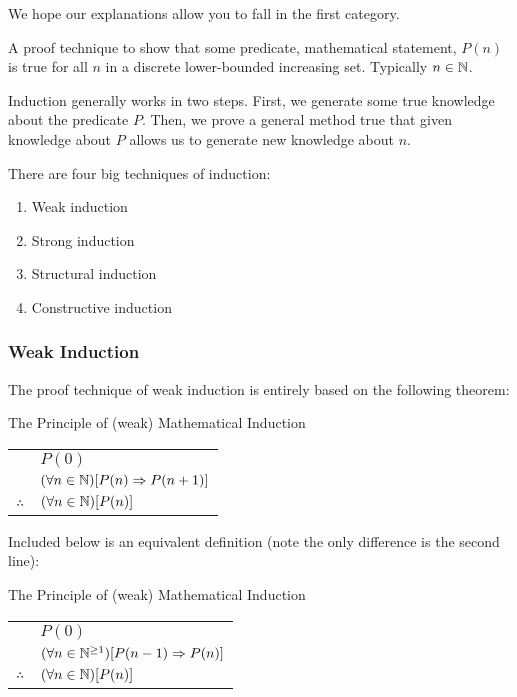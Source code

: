 \documentclass[main.tex]{subfiles}
\begin{document}
We hope our explanations allow you to fall in the first category.

\begin{defn}
	A proof technique to show that some predicate, mathematical statement, \(P(n)\) is true for all \(n\) in a discrete lower-bounded increasing set. Typically \(n \in \mathbb{N}\). 
	
	Induction generally works in two steps. First, we generate some true knowledge about the predicate \(P\). Then, we prove a general method true that given knowledge about \(P\) allows us to generate new knowledge about \(n\).
\end{defn}

There are four big techniques of induction:

\begin{enumerate}
	\item Weak induction
	\item Strong induction
	\item Structural induction
	\item Constructive induction
\end{enumerate}

\subsubsection{Weak Induction}

The proof technique of weak induction is entirely based on the following theorem:

\begin{thm}{The Principle of (weak) Mathematical Induction \label{pmi-1}}
	\begin{center}
		\begin{tabular}{rl}
			& \(P(0)\) \\
			& \((\forall n \in \mathbb{N})[P(n) \Rightarrow P(n+1)]\) \\
			\midrule
			\(\therefore\) & \((\forall n \in \mathbb{N})[P(n)]\) \\
		\end{tabular}
	\end{center}
\end{thm}

Included below is an equivalent definition (note the only difference is the second line):

\begin{thm}{The Principle of (weak) Mathematical Induction \label{pmi-2}}
	\begin{center}
		\begin{tabular}{rl}
			& \(P(0)\) \\
			& \((\forall n \in \mathbb{N}^{\geq 1})[P(n-1) \Rightarrow P(n)]\) \\
			\midrule
			\(\therefore\) & \((\forall n \in \mathbb{N})[P(n)]\) \\
		\end{tabular}
	\end{center}
\end{thm}
\end{document}
